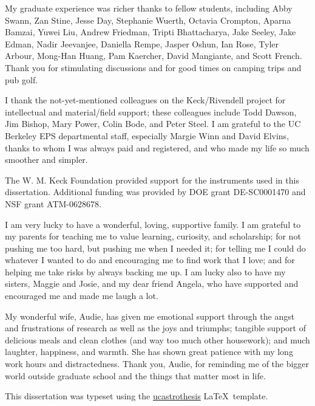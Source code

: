\documentclass[12pt]{myucthesis}
\begin{document}
\begin{frontmatter}
\begin{acknowledgements}
My graduate experience was richer thanks to fellow students, including Abby Swann, Zan Stine, Jesse Day, Stephanie Wuerth, Octavia Crompton, Aparna Bamzai, Yuwei Liu, Andrew Friedman, Tripti Bhattacharya, Jake Seeley, Jake Edman, Nadir Jeevanjee, Daniella Rempe, Jasper Oshun, Ian Rose, Tyler Arbour, Mong-Han Huang, Pam Kaercher, David Mangiante, and Scott French.  Thank you for stimulating discussions and for good times on camping trips and pub golf.

I thank the not-yet-mentioned colleagues on the Keck/Rivendell project for intellectual and material/field support; these colleagues include Todd Dawson, Jim Bishop, Mary Power, Colin Bode, and Peter Steel.  I am grateful to the UC Berkeley EPS departmental staff, especially Margie Winn and David Elvins, thanks to whom I was always paid and registered, and who made my life so much smoother and simpler.

The W. M. Keck Foundation provided support for the instruments used in this dissertation.  Additional funding was provided by DOE grant DE-SC0001470 and NSF grant ATM-0628678.

I am very lucky to have a wonderful, loving, supportive family. I am grateful to my parents for teaching me to value learning, curiosity, and scholarship; for not pushing me too hard, but pushing me when I needed it; for telling me I could do whatever I wanted to do and encouraging me to find work that I love; and for helping me take risks by always backing me up.  I am lucky also to have my sisters, Maggie and Josie, and my dear friend Angela, who have supported and encouraged me and made me laugh a lot.

My wonderful wife, Audie, has given me emotional support through the angst and frustrations of research as well as the joys and triumphs; tangible support of delicious meals and clean clothes (and way too much other housework); and much laughter, happiness, and warmth.  She has shown great patience with my long work hours and distractedness.  Thank you, Audie, for reminding me of the bigger world outside graduate school and the things that matter most in life.

\bigskip \bigskip \bigskip \bigskip
This dissertation was typeset using the
\href{https://github.com/pkgw/ucastrothesis}{\textsf{ucastrothesis}}
\LaTeX\ template.

\end{acknowledgements}
\end{frontmatter}







{}
\end{document}
